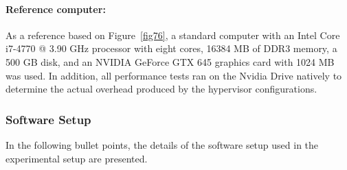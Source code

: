     \paragraph{Reference computer:}
    As a reference based on Figure~\ref{fig76}, a standard computer with an Intel Core i7-4770 @ 3.90 GHz processor with eight cores, 16384 MB of DDR3 memory, a 500 GB disk, and an NVIDIA GeForce GTX 645 graphics card with 1024 MB was used. In addition, all performance tests ran on the Nvidia Drive natively to determine the actual overhead produced by the hypervisor configurations.
    
    

 
    
    
   


    \subsubsection{Software Setup}
    In the following bullet points, the details of the software setup used in the experimental setup are presented.


